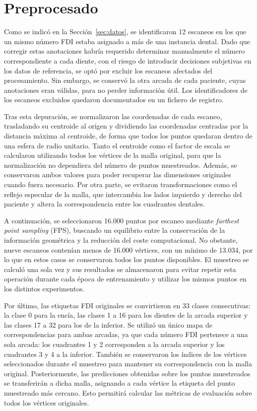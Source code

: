 \section{Preprocesado}
\label{sec:preprocesado}

Como se indicó en la Sección~\ref{sec:datos}, se identificaron 12 escaneos en los que un mismo número FDI estaba asignado a más de una instancia dental. Dado que corregir estas anotaciones habría requerido determinar manualmente el número correspondiente a cada diente, con el riesgo de introducir decisiones subjetivas en los datos de referencia, se optó por excluir los escaneos afectados del procesamiento. Sin embargo, se conservó la otra arcada de cada paciente, cuyas anotaciones eran válidas, para no perder información útil. Los identificadores de los escaneos excluidos quedaron documentados en un fichero de registro.

Tras esta depuración, se normalizaron las coordenadas de cada escaneo, trasladando su centroide al origen y dividiendo las coordenadas centradas por la distancia máxima al centroide, de forma que todos los puntos quedaran dentro de una esfera de radio unitario. Tanto el centroide como el factor de escala se calcularon utilizando todos los vértices de la malla original, para que la normalización no dependiera del número de puntos muestreados. Además, se conservaron ambos valores para poder recuperar las dimensiones originales cuando fuera necesario. Por otra parte, se evitaron transformaciones como el reflejo especular de la malla, que intercambia los lados izquierdo y derecho del paciente y altera la correspondencia entre los cuadrantes dentales.

A continuación, se seleccionaron 16.000 puntos por escaneo mediante \textit{farthest point sampling} (FPS), buscando un equilibrio entre la conservación de la información geométrica y la reducción del coste computacional. No obstante, nueve escaneos contenían menos de 16.000 vértices, con un mínimo de 13.034, por lo que en estos casos se conservaron todos los puntos disponibles. El muestreo se calculó una sola vez y sus resultados se almacenaron para evitar repetir esta operación durante cada época de entrenamiento y utilizar los mismos puntos en los distintos experimentos.

Por último, las etiquetas FDI originales se convirtieron en 33 clases consecutivas: la clase 0 para la encía, las clases 1 a 16 para los dientes de la arcada superior y las clases 17 a 32 para los de la inferior. Se utilizó un único mapa de correspondencias para ambas arcadas, ya que cada número FDI pertenece a una sola arcada: los cuadrantes 1 y 2 corresponden a la arcada superior y los cuadrantes 3 y 4 a la inferior. También se conservaron los índices de los vértices seleccionados durante el muestreo para mantener su correspondencia con la malla original. Posteriormente, las predicciones obtenidas sobre los puntos muestreados se transferirán a dicha malla, asignando a cada vértice la etiqueta del punto muestreado más cercano. Esto permitirá calcular las métricas de evaluación sobre todos los vértices originales.

